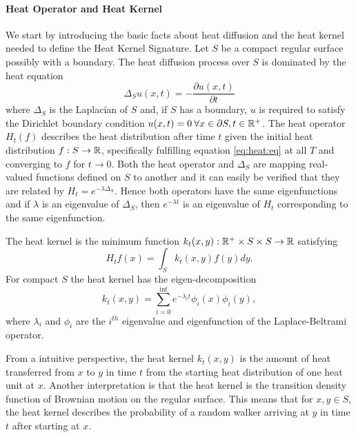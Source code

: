 \paragraph{Heat Operator and Heat Kernel}
We start by introducing the basic facts about heat diffusion and the heat kernel needed to define the Heat Kernel Signature.
Let $S$ be a compact regular surface possibly with a boundary.
The heat diffusion process over $S$ is dominated by the heat equation
\begin{equation*}
	\Delta_S u(x,t) = -\frac{\partial u(x,t)}{\partial t}
	\label{eq:heat:eq}
\end{equation*}
where $\Delta_S$ is the Laplacian of $S$ and, if $S$ has a boundary, $u$ is required to satisfy the Dirichlet boundary condition $u(x,t) = 0 \: \forall x\in \partial S,t\in \mathbb{R}^+$.
The heat operator $H_t(f)$ describes the heat distribution after time $t$ given the initial heat distribution $f: S \rightarrow \mathbb{R}$, specifically fulfilling equation \eqref{eq:heat:eq} at all $T$ and converging to $f$ for $t \rightarrow 0$.
Both the heat operator and $\Delta_S$ are mapping real-valued functions defined on $S$ to another and it can easily be verified that they are related by $H_t = e^{-\lambda \Delta_S}$.
Hence both operators have the same eigenfunctions and if $\lambda$ is an eigenvalue of $\Delta_S$, then $e^{-\lambda t}$ is an eigenvalue of $H_t$ corresponding to the same eigenfunction.
\begin{mydef}
	The heat kernel is the minimum function $k_t(x,y):\mathbb{R}^+ \times S \times S \rightarrow \mathbb{R}$ satisfying
	\begin{equation}
		H_tf(x) = \int_S k_t(x,y)f(y)dy.
		\label{eq:heat:kernel}
	\end{equation}
	For compact $S$ the heat kernel has the eigen-decomposition
	\begin{equation}
		k_t(x,y) = \sum_{i=0}^{\inf} e^{-\lambda_i t}\phi_i(x)\phi_i(y),
		\label{eq:heat:kernel:decomp}
	\end{equation}
	where $\lambda_i$ and $\phi_i$ are the $i^{th}$ eigenvalue and eigenfunction of the Laplace-Beltrami operator.
\end{mydef}
From a intuitive perspective, the heat kernel $k_t(x,y)$ is the amount of heat transferred from $x$ to $y$ in time $t$ from the starting heat distribution of one heat unit at $x$.
Another interpretation is that the heat kernel is the transition density function of Brownian motion on the regular surface.
This means that for $x,y\in S$, the heat kernel describes the probability of a random walker arriving at $y$ in time $t$ after starting at $x$.

